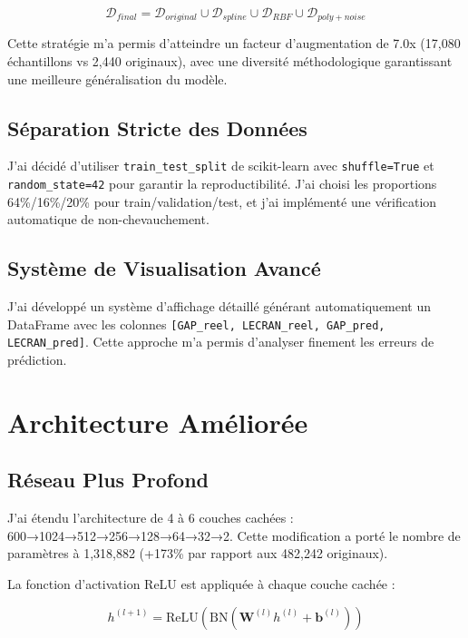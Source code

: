 \documentclass[10pt,twocolumn]{article}
\begin{document}
\begin{equation}
\mathcal{D}_{final} = \mathcal{D}_{original} \cup \mathcal{D}_{spline} \cup \mathcal{D}_{RBF} \cup \mathcal{D}_{poly+noise}
\end{equation}

Cette stratégie m'a permis d'atteindre un facteur d'augmentation de 7.0x (17,080 échantillons vs 2,440 originaux), avec une diversité méthodologique garantissant une meilleure généralisation du modèle.

\subsection{Séparation Stricte des Données}

J'ai décidé d'utiliser \texttt{train\_test\_split} de scikit-learn avec \texttt{shuffle=True} et \texttt{random\_state=42} pour garantir la reproductibilité. J'ai choisi les proportions 64\%/16\%/20\% pour train/validation/test, et j'ai implémenté une vérification automatique de non-chevauchement.

\subsection{Système de Visualisation Avancé}

J'ai développé un système d'affichage détaillé générant automatiquement un DataFrame avec les colonnes \texttt{[GAP\_reel, LECRAN\_reel, GAP\_pred, LECRAN\_pred]}. Cette approche m'a permis d'analyser finement les erreurs de prédiction.



\section{Architecture Améliorée}

\subsection{Réseau Plus Profond}

J'ai étendu l'architecture de 4 à 6 couches cachées : 600→1024→512→256→128→64→32→2. Cette modification a porté le nombre de paramètres à 1,318,882 (+173\% par rapport aux 482,242 originaux).

La fonction d'activation ReLU est appliquée à chaque couche cachée :

\begin{equation}
h^{(l+1)} = \text{ReLU}(\text{BN}(\mathbf{W}^{(l)} h^{(l)} + \mathbf{b}^{(l)}))
\end{equation}
\end{document}
